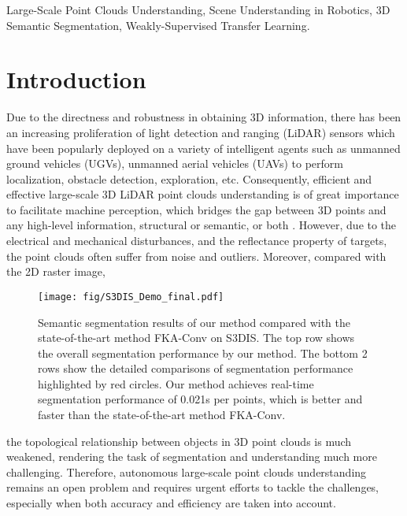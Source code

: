 \documentclass[journal]{IEEEtran}
\begin{document}
\begin{IEEEkeywords}

Large-Scale Point Clouds Understanding, Scene Understanding in Robotics, 3D Semantic Segmentation, Weakly-Supervised Transfer Learning.
\end{IEEEkeywords}






\IEEEpeerreviewmaketitle



\section{Introduction}
\IEEEPARstart 
{D}{ue} to the directness and robustness in obtaining 3D information, there has been an increasing proliferation of light detection and ranging (LiDAR) sensors which have been popularly deployed on a variety of intelligent agents such as unmanned ground vehicles (UGVs), unmanned aerial vehicles (UAVs) to perform localization, obstacle detection, exploration, etc. Consequently, efficient and effective large-scale 3D LiDAR point clouds understanding is of great importance to facilitate machine perception, which bridges the gap between 3D points and any high-level information, structural or semantic, or both \cite{wang2019re,cong2018speedup, zhang2019shellnet,guo20143d}. However, due to the electrical and mechanical disturbances, and the reflectance property of targets, the point clouds often suffer from noise and outliers. Moreover, compared with the 2D raster image,
\begin{figure}[htbp!]
\centering
\texttt{[image: fig/S3DIS\_Demo\_final.pdf]}
\caption{Semantic segmentation results of our method compared with the state-of-the-art method FKA-Conv\cite{boulch2020fka} on S3DIS\cite{armeni20163d}. The top row shows the overall segmentation performance by our method. The bottom 2 rows show the detailed comparisons of segmentation performance highlighted by red circles. Our method achieves real-time segmentation performance of 0.021s per  points, which is better and faster than the state-of-the-art method FKA-Conv.}
\label{fig_demo}
\vspace{-0.38cm}
\end{figure}
the topological relationship between objects in 3D point clouds is much weakened, rendering the task of segmentation and understanding much more challenging. Therefore, autonomous large-scale point clouds understanding remains an open problem and requires urgent efforts to tackle the challenges, especially when both accuracy and efficiency are taken into account.   
\end{document}
